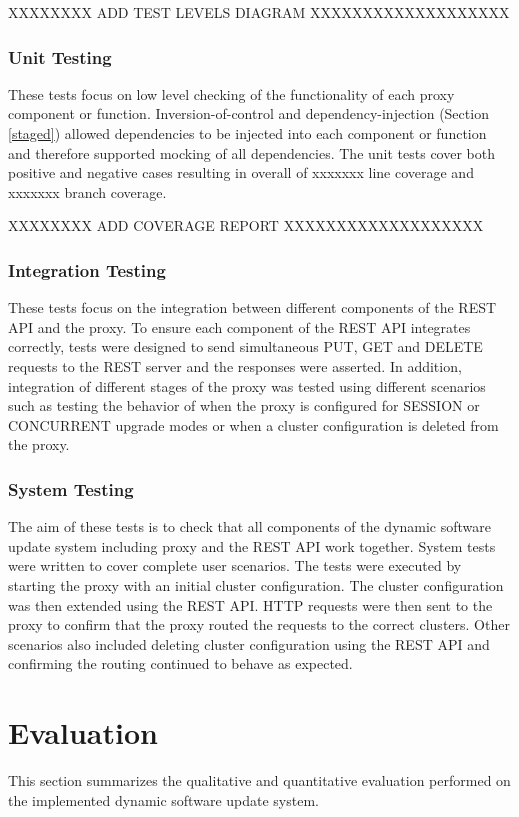 \documentclass[a4paper,11pt,twoside]{article}
\begin{document}
XXXXXXXX ADD TEST LEVELS DIAGRAM  XXXXXXXXXXXXXXXXXXX\bigskip

\subsubsection{Unit Testing}
These tests focus on low level checking of the functionality of each proxy component or function. Inversion-of-control and dependency-injection (Section \ref{staged}) allowed dependencies to be injected into each component or function and therefore supported mocking of all dependencies. The unit tests cover both positive and negative cases resulting in overall of xxxxxxx line coverage and xxxxxxx branch coverage.\bigskip    

XXXXXXXX ADD COVERAGE REPORT XXXXXXXXXXXXXXXXXXX\bigskip

\subsubsection{Integration Testing}
These tests focus on the integration between different components of the REST API and the proxy. To ensure each component of the REST API integrates correctly, tests were designed to send simultaneous PUT, GET and DELETE requests to the REST server and the responses were asserted. In addition, integration of different stages of the proxy was tested using different scenarios such as testing the behavior of when the proxy is configured for SESSION or CONCURRENT upgrade modes or when a cluster configuration is deleted from the proxy.

\subsubsection{System Testing}
The aim of these tests is to check that all components of the dynamic software update system including proxy and the REST API work together. System tests were written to cover complete user scenarios. The tests were executed by starting the proxy with an initial cluster configuration. The cluster configuration was then extended using the REST API.  HTTP requests were then sent to the proxy to confirm that the proxy routed the requests to the correct clusters.  Other scenarios also included deleting cluster configuration using the REST API and confirming the routing continued to behave as expected.

\clearpage
\section{Evaluation}
This section summarizes the qualitative and quantitative evaluation performed on the implemented dynamic software update system.
\end{document}
